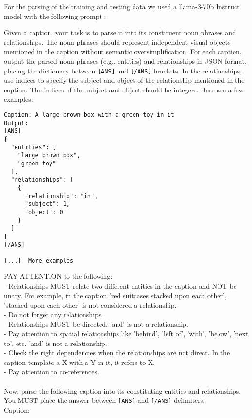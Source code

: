 For the parsing of the training and testing data we used a llama-3-70b Instruct model with the following prompt :
\vspace{-1em}
\begin{tcolorbox}[colback=gray!5!white, colframe=gray!75!black, title=Parsing Prompt]
\footnotesize
Given a caption, your task is to parse it into its constituent noun phrases and relationships. The noun phrases should represent independent visual objects mentioned in the caption without semantic oversimplification.
For each caption, output the parsed noun phrases (e.g., entities) and relationships in JSON format, placing the dictionary between \texttt{[ANS]} and \texttt{[/ANS]} brackets. In the relationships, use indices to specify the subject and object of the relationship mentioned in the caption. The indices of the subject and object should be integers.
Here are a few examples:
\begin{lstlisting}
Caption: A large brown box with a green toy in it
Output:
[ANS]
{
  "entities": [
    "large brown box",
    "green toy"
  ],
  "relationships": [
    {
      "relationship": "in",
      "subject": 1,
      "object": 0
    }
  ]
}
[/ANS]

[...]  More examples
\end{lstlisting}

PAY ATTENTION to the following:\\
- Relationships MUST relate two different entities in the caption and NOT be unary. For example, in the caption 'red suitcases stacked upon each other', 'stacked upon each other' is not considered a relationship.\\
- Do not forget any relationships.\\
- Relationships MUST be directed. 'and' is not a relationship.\\
- Pay attention to spatial relationships like 'behind', 'left of', 'with', 'below', 'next to', etc. 'and' is not a relationship.\\
- Check the right dependencies when the relationships are not direct. In the caption template a X with a Y in it, it refers to X.\\
- Pay attention to co-references.\\ \\
Now, parse the following caption into its constituting entities and relationships. You MUST place the answer between \texttt{[ANS]} and \texttt{[/ANS]} delimiters.\\
Caption:
\end{tcolorbox}

